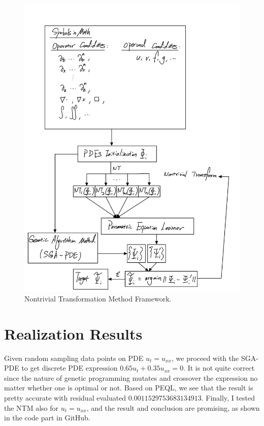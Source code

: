 \documentclass[12pt]{article}
\begin{document}
\begin{figure}[!t]
  \centering
  \includegraphics[width=\textwidth]{NTM.jpeg}
  \caption{Nontrivial Transformation Method Framework.}
  \label{fig:NTM}
\end{figure}




\section{Realization Results}
\label{sec:resu}
Given random sampling data points on PDE $u_t=u_{xx}$, we proceed with the SGA-PDE to get discrete PDE expression $0.65u_t+0.35u_{xx}=0$. It is not quite correct since the nature of genetic programming mutates and crossover the expression no matter whether one is optimal or not. Based on PEQL, we see that the result is pretty accurate with residual evaluated $0.0011529753683134913$. Finally, I tested the NTM also for $u_t=u_{xx}$, and the result and conclusion are promising, as shown in the code part in GitHub. 
\end{document}
